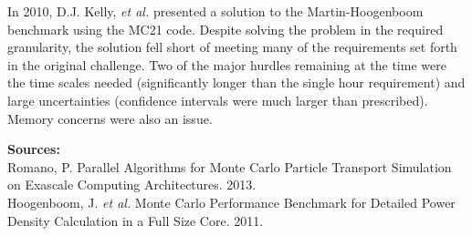 \documentclass{article}
\begin{document}
In 2010, D.J. Kelly, \textit{et al.} presented a solution to the Martin-Hoogenboom benchmark using the MC21 code. Despite solving the problem in the required granularity, the solution fell short of meeting many of the requirements set forth in the original challenge. Two of the major hurdles remaining at the time were the time scales needed (significantly longer than the single hour requirement) and large uncertainties (confidence intervals were much larger than prescribed). Memory concerns were also an issue.

\textbf{Sources:}\\
Romano, P. Parallel Algorithms for Monte Carlo Particle Transport Simulation on
Exascale Computing Architectures. 2013. \\
Hoogenboom, J. \textit{et al.} Monte Carlo Performance Benchmark for Detailed Power Density Calculation in a Full Size Core. 2011. \\



\end{document}
